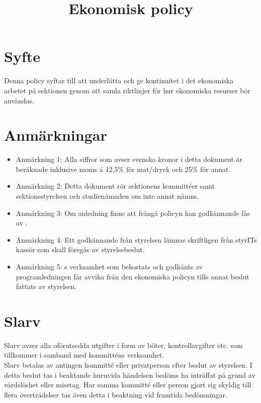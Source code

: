 \documentclass[11pt, includeaddress]{classes/cthit}
\begin{document}
\title{Ekonomisk policy}
\maketitle

\thispagestyle{empty}

\newpage

\makeheadfoot%

\setcounter{tocdepth}{2}
\setcounter{page}{1}
\tableofcontents

\newpage

\section{Syfte}
Denna policy syftar till att underlätta och ge kontinuitet i det ekonomiska arbetet på sektionen genom att samla riktlinjer för hur ekonomiska resurser bör användas.

\section{Anmärkningar}
\begin{itemize}
	\item Anmärkning 1: Alla siffror som avser svenska kronor i detta dokument är beräknade inklusive moms á 12,5\% för mat/dryck och 25\% för annat.
	\item Anmärkning 2: Detta dokument rör sektionens kommittéer
          samt sektionsstyrelsen \STYRIT{} och studienämnden \SNIT{}
          om inte annat nämns.
	\item Anmärkning 3: Om anledning finns att frångå policyn kan godkännande fås av \STYRIT{}.
	\item Anmärkning 4: Ett godkännande från styrelsen lämnas skriftligen från styrITs kassör som skall föregås av styrelsebeslut.
	\item Anmärkning 5: \SNIT{}s verksamhet som bekostats och godkänts av programledningen får avvika från den ekonomiska policyn tills annat beslut fattats av styrelsen.
\end{itemize}

\section{Slarv}
Slarv avser alla oförutsedda utgifter i form av böter, kontrollavgifter etc. som tillkommer i samband med kommitténs verksamhet. \\
Slarv betalas av antingen kommitté eller privatperson efter beslut av styrelsen. I detta beslut tas i beaktande huruvida händelsen bedöms ha inträffat på grund av vårdslöshet eller misstag. Har samma kommitté eller person gjort sig skyldig till flera överträdelser tas även detta i beaktning vid framtida bedömningar.
\end{document}
